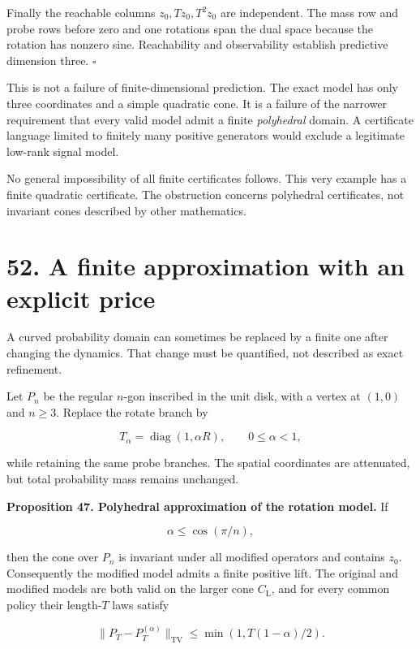 \documentclass[11pt,letterpaper]{article}
\begin{document}
Finally the reachable columns \(z_0,Tz_0,T^2z_0\) are independent. The
mass row and probe rows before zero and one rotations span the dual
space because the rotation has nonzero sine. Reachability and
observability establish predictive dimension three. \(\square\)

This is not a failure of finite-dimensional prediction. The exact model
has only three coordinates and a simple quadratic cone. It is a failure
of the narrower requirement that every valid model admit a finite
\emph{polyhedral} domain. A certificate language limited to finitely
many positive generators would exclude a legitimate low-rank signal
model.

No general impossibility of all finite certificates follows. This very
example has a finite quadratic certificate. The obstruction concerns
polyhedral certificates, not invariant cones described by other
mathematics.

\section{52. A finite approximation with an explicit
price}\label{a-finite-approximation-with-an-explicit-price}

A curved probability domain can sometimes be replaced by a finite one
after changing the dynamics. That change must be quantified, not
described as exact refinement.

Let \(P_n\) be the regular \(n\)-gon inscribed in the unit disk, with a
vertex at \((1,0)\) and \(n\geq3\). Replace the rotate branch by

\[
T_\alpha=\operatorname{diag}(1,\alpha R),\qquad 0\leq\alpha<1,
\]

while retaining the same probe branches. The spatial coordinates are
attenuated, but total probability mass remains unchanged.

\textbf{Proposition 47. Polyhedral approximation of the rotation model.}
If

\[
\alpha\leq\cos(\pi/n),
\]

then the cone over \(P_n\) is invariant under all modified operators and
contains \(z_0\). Consequently the modified model admits a finite
positive lift. The original and modified models are both valid on the
larger cone \(C_{\mathrm L}\), and for every common policy their
length-\(T\) laws satisfy

\[
\boxed{\|P_T-P_T^{(\alpha)}\|_{\mathrm{TV}}
\leq\min(1,T(1-\alpha)/2).}
\]
\end{document}
